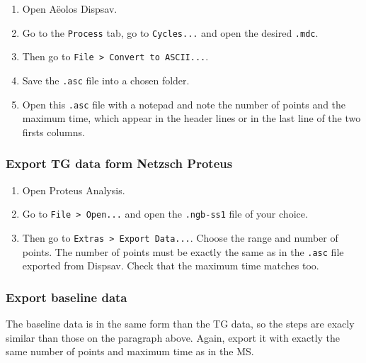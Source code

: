 \documentclass[a4paper, 11pt, raggedright, parskip]{tufte-style-article}
\begin{document}
\begin{enumerate}
	
\item Open Aëolos Dispsav.

\item Go to the \texttt{Process} tab, go to \texttt{Cycles...} and open the desired \texttt{.mdc}.

\item Then go to \texttt{File > Convert to ASCII...}. 

\item Save the \texttt{.asc} file into a chosen folder.

\item Open this \texttt{.asc} file with a notepad and note the number of points and the maximum time, which appear in the header lines or in the last line of the two firsts columns.

\end{enumerate}


\subsubsection{Export TG data form Netzsch Proteus}

\begin{enumerate}
	
\item Open Proteus Analysis.
	
\item Go to \texttt{File > Open...} and open the \texttt{.ngb-ss1} file of your choice.

\item Then go to \texttt{Extras > Export Data...}. Choose the range and number of points. The number of points must be exactly the same as in the \texttt{.asc} file exported from Dispsav. Check that the maximum time matches too.

\end{enumerate}


\subsubsection{Export baseline data}

The baseline data is in the same form than the TG data, so the steps are exacly similar than those on the paragraph above. Again, export it with exactly the same number of points and maximum time as in the MS.
\end{document}
